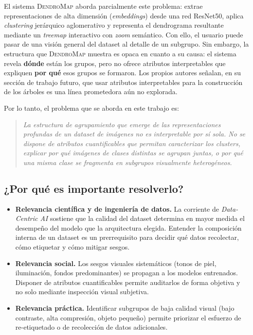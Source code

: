 \documentclass[11pt,a4paper]{article}
\begin{document}
El sistema \textsc{DendroMap} \cite{bertucci2023} aborda parcialmente este
problema: extrae representaciones de alta dimensión (\emph{embeddings}) desde una
red ResNet50, aplica \emph{clustering} jerárquico aglomerativo y representa el
dendrograma resultante mediante un \emph{treemap} interactivo con
\emph{zoom} semántico. Con ello, el usuario puede pasar de una visión general
del dataset al detalle de un subgrupo. Sin embargo, la estructura que
\textsc{DendroMap} muestra es opaca en cuanto a su causa: el sistema revela
\textbf{dónde} están los grupos, pero no ofrece atributos interpretables que
expliquen \textbf{por qué} esos grupos se formaron. Los propios autores señalan,
en su sección de trabajo futuro, que usar atributos interpretables para la
construcción de los árboles es una línea prometedora aún no explorada.

Por lo tanto, el problema que se aborda en este trabajo es:

\begin{quote}
\itshape
La estructura de agrupamiento que emerge de las representaciones profundas de un
dataset de imágenes no es interpretable por sí sola. No se dispone de atributos
cuantificables que permitan caracterizar los clusters, explicar por qué imágenes
de clases distintas se agrupan juntas, o por qué una misma clase se fragmenta en
subgrupos visualmente heterogéneos.
\end{quote}

\subsection*{¿Por qué es importante resolverlo?}

\begin{itemize}[leftmargin=*]
  \item \textbf{Relevancia científica y de ingeniería de datos.} La corriente de
  \emph{Data-Centric AI} sostiene que la calidad del dataset determina en mayor
  medida el desempeño del modelo que la arquitectura elegida. Entender la
  composición interna de un dataset es un prerrequisito para decidir qué datos
  recolectar, cómo etiquetar y cómo mitigar sesgos.
  \item \textbf{Relevancia social.} Los sesgos visuales sistemáticos (tonos de
  piel, iluminación, fondos predominantes) se propagan a los modelos entrenados.
  Disponer de atributos cuantificables permite auditarlos de forma objetiva y no
  solo mediante inspección visual subjetiva.
  \item \textbf{Relevancia práctica.} Identificar subgrupos de baja calidad
  visual (bajo contraste, alta compresión, objeto pequeño) permite priorizar el
  esfuerzo de re-etiquetado o de recolección de datos adicionales.
\end{itemize}
\end{document}
